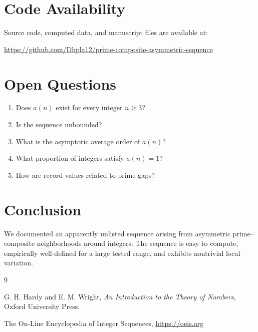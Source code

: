 \documentclass[11pt,a4paper]{article}
\begin{document}
\section{Code Availability}

Source code, computed data, and manuscript files are available at:

\begin{center}
\url{https://github.com/Dhpla12/prime-composite-asymmetric-sequence}
\end{center}

\section{Open Questions}

\begin{enumerate}
    \item Does \(a(n)\) exist for every integer \(n \ge 3\)?
    \item Is the sequence unbounded?
    \item What is the asymptotic average order of \(a(n)\)?
    \item What proportion of integers satisfy \(a(n)=1\)?
    \item How are record values related to prime gaps?
\end{enumerate}

\section{Conclusion}

We documented an apparently unlisted sequence arising from asymmetric prime--composite neighborhoods around integers. The sequence is easy to compute, empirically well-defined for a large tested range, and exhibits nontrivial local variation.

\begin{thebibliography}{9}

G. H. Hardy and E. M. Wright,
\textit{An Introduction to the Theory of Numbers},
Oxford University Press.

The On-Line Encyclopedia of Integer Sequences,
\url{https://oeis.org}

\end{thebibliography}
\end{document}
